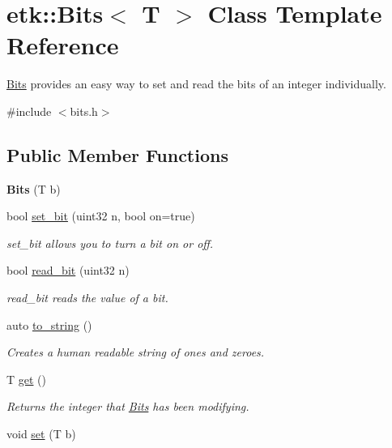 \hypertarget{classetk_1_1_bits}{\section{etk\-:\-:Bits$<$ T $>$ Class Template Reference}
\label{classetk_1_1_bits}
}


\hyperlink{classetk_1_1_bits}{Bits} provides an easy way to set and read the bits of an integer individually.  




{\ttfamily \#include $<$bits.\-h$>$}

\subsection*{Public Member Functions}
\begin{DoxyCompactItemize}
\item 
\hypertarget{classetk_1_1_bits_a0ea9f6cc412e17a55ef34cf2753f7f3e}{{\bfseries Bits} (T b)}\label{classetk_1_1_bits_a0ea9f6cc412e17a55ef34cf2753f7f3e}

\item 
bool \hyperlink{classetk_1_1_bits_a68e6ce9f8e8e45fc1a86c00345e03543}{set\-\_\-bit} (uint32 n, bool on=true)
\begin{DoxyCompactList}\small\item\em set\-\_\-bit allows you to turn a bit on or off. \end{DoxyCompactList}\item 
bool \hyperlink{classetk_1_1_bits_a90115400de42ece15a82540600dee92e}{read\-\_\-bit} (uint32 n)
\begin{DoxyCompactList}\small\item\em read\-\_\-bit reads the value of a bit. \end{DoxyCompactList}\item 
auto \hyperlink{classetk_1_1_bits_a692698877d8fa33a6570750979018274}{to\-\_\-string} ()
\begin{DoxyCompactList}\small\item\em Creates a human readable string of ones and zeroes. \end{DoxyCompactList}\item 
\hypertarget{classetk_1_1_bits_a3d46dbbf64a5e23d1cf7774c3e13c2ea}{T \hyperlink{classetk_1_1_bits_a3d46dbbf64a5e23d1cf7774c3e13c2ea}{get} ()}\label{classetk_1_1_bits_a3d46dbbf64a5e23d1cf7774c3e13c2ea}

\begin{DoxyCompactList}\small\item\em Returns the integer that \hyperlink{classetk_1_1_bits}{Bits} has been modifying. \end{DoxyCompactList}\item 
\hypertarget{classetk_1_1_bits_a8a98aeb0aa064f7c9783148f3c77a9ca}{void \hyperlink{classetk_1_1_bits_a8a98aeb0aa064f7c9783148f3c77a9ca}{set} (T b)}\label{classetk_1_1_bits_a8a98aeb0aa064f7c9783148f3c77a9ca}


\end{DoxyCompactItemize}
